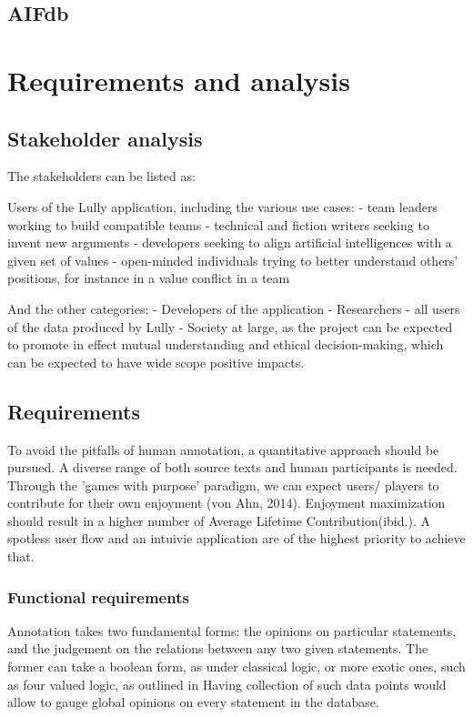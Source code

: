 \documentclass{report}
\begin{document}
\section{AIFdb}

\chapter{Requirements and analysis}

\section{Stakeholder analysis}
The stakeholders can be listed as:

Users of the Lully application, including the various use cases:
- team leaders working to build compatible teams
- technical and fiction writers seeking to invent new arguments
- developers seeking to align artificial intelligences with a given set of values 
- open-minded individuals trying to better understand others' positions, for instance in a value conflict in a team

And the other categories:
- Developers of the application 
- Researchers - all users of the data produced by Lully
- Society at large, as the project can be expected to promote in effect mutual understanding and ethical decision-making, which can be expected to have wide scope positive impacts.

\section{Requirements}
To avoid the pitfalls of human annotation, a quantitative approach should be pursued. A diverse range of both source texts and human participants is needed. Through the 'games with purpose' paradigm, we can expect users/ players to contribute for their own enjoyment (von Ahn, 2014). Enjoyment maximization should result in a higher number of Average Lifetime Contribution(ibid.).  A spotless user flow and an intuivie application are of the highest priority to achieve that.


\subsection{Functional requirements}

Annotation takes two fundamental forms: the opinions on particular statements, and the judgement on the relations between any two given statements.
The former can  take a boolean form, as under classical logic, or more exotic ones, such as four valued logic, as outlined in  \cite{Priest2008}
Having collection of such data points would allow to gauge global opinions on every statement in the database.
\end{document}
